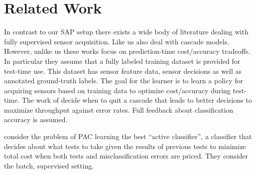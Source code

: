 %
%

\section{Related Work}
%

In contrast to our SAP setup there exists a wide body of literature dealing with fully supervised sensor acquisition. Like us \cite{AISTATS13_SupervisedSequentialLearning_TrapezSaligram} also deal with cascade models. However, unlike us these works focus on prediction-time cost/accuracy tradeoffs. In particular they assume that a fully labeled training dataset is provided for test-time use. This dataset has sensor feature data, sensor decisions as well as annotated ground-truth labels. The goal for the learner is to learn a policy for acquiring sensors based on training data to optimize cost/accuracy during test-time. The work of
\cite{poczos2009} decide when to quit a cascade that leads to better decisions to maximize throughput against error rates. Full feedback about classification accuracy is assumed.

\citet{ActiveClass-AIJ-s} consider the problem of PAC learning the best ``active classifier'',
a classifier that decides about what tests to take given the results of previous tests
to minimize total cost when both tests and misclassification errors are priced.
They consider the batch, supervised setting. 

